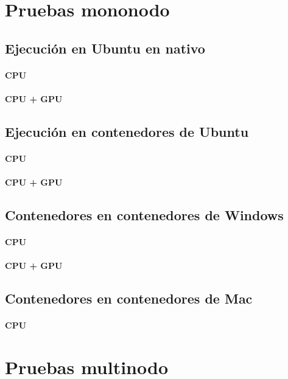 \section{Pruebas mononodo}
\subsection{Ejecución en Ubuntu en nativo}
\paragraph{CPU}

\paragraph{CPU + GPU}

\subsection{Ejecución en contenedores de Ubuntu}
\paragraph{CPU}

\paragraph{CPU + GPU}

\subsection{Contenedores en contenedores de Windows}
\paragraph{CPU}

\paragraph{CPU + GPU}

\subsection{Contenedores en contenedores de Mac}
\paragraph{CPU}

\section{Pruebas multinodo}
